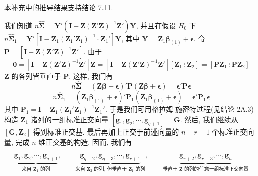 
本补充中的推导结果支持结论 7.11.

我们知道 $n\hat{\boldsymbol{\Sigma}}=\mathbf{Y}'(\mathbf{I}-\mathbf{Z}(\mathbf{Z}'\mathbf{Z})^{-1}\mathbf{Z}')\mathbf{Y}$, 并且在假设 $H_0$ 下 $n\hat{\boldsymbol{\Sigma}}_1=\mathbf{Y}'[\mathbf{I}-\mathbf{Z}_1(\mathbf{Z}_1'\mathbf{Z}_1)^{-1}\cdot\mathbf{Z}_1']\mathbf{Y}$, 其中 $\mathbf{Y}=\mathbf{Z}_1\boldsymbol{\beta}_{(1)}+\boldsymbol{\epsilon}$. 令 $\mathbf{P}=[\mathbf{I}-\mathbf{Z}(\mathbf{Z}'\mathbf{Z})^{-1}\mathbf{Z}']$. 由于
\[
\mathbf{0}=[\mathbf{I}-\mathbf{Z}(\mathbf{Z}'\mathbf{Z})^{-1}\mathbf{Z}']\mathbf{Z}
=[\mathbf{I}-\mathbf{Z}(\mathbf{Z}'\mathbf{Z})^{-1}\mathbf{Z}'][\mathbf{Z}_1\ \vdots\ \mathbf{Z}_2]
=[\mathbf{P}\mathbf{Z}_1\ \vdots\ \mathbf{P}\mathbf{Z}_2]
\]
$\mathbf{Z}$ 的各列皆垂直于 $\mathbf{P}$. 这样, 我们有
\[
n\hat{\boldsymbol{\Sigma}}=(\mathbf{Z}\boldsymbol{\beta}+\boldsymbol{\epsilon})'\mathbf{P}(\mathbf{Z}\boldsymbol{\beta}+\boldsymbol{\epsilon})=\boldsymbol{\epsilon}'\mathbf{P}\boldsymbol{\epsilon}
\]
\[
n\hat{\boldsymbol{\Sigma}}_1=(\mathbf{Z}_1\boldsymbol{\beta}_{(1)}+\boldsymbol{\epsilon})'\mathbf{P}_1(\mathbf{Z}_1\boldsymbol{\beta}_{(1)}+\boldsymbol{\epsilon})=\boldsymbol{\epsilon}'\mathbf{P}_1\boldsymbol{\epsilon}
\]
其中 $\mathbf{P}_1=\mathbf{I}-\mathbf{Z}_1(\mathbf{Z}_1'\mathbf{Z}_1)^{-1}\mathbf{Z}_1'$. 于是我们可用格拉姆-施密特过程(见结论 2A.3)构造 $\mathbf{Z}_1$ 诸列的一组标准正交向量 $[\mathbf{g}_1,\mathbf{g}_2,\cdots,\mathbf{g}_{q+1}]=\mathbf{G}$. 然后, 我们继续从 $[\mathbf{G},\mathbf{Z}_2]$ 得到标准正交基. 最后再加上正交于前述向量的 $n-r-1$ 个标准正交向量, 完成 $n$ 维正交基的构造. 因而, 我们有

\[
\underbrace{\mathbf{g}_1,\mathbf{g}_2,\cdots,\mathbf{g}_{q+1}}_{\text{来自 }\mathbf{Z}_1\text{ 的列}},\qquad
\underbrace{\mathbf{g}_{q+2},\mathbf{g}_{q+3},\cdots,\mathbf{g}_{r+1}}_{\text{来自 }\mathbf{Z}_2\text{ 的列, 但垂直于 }\mathbf{Z}_1\text{ 的列}},\qquad
\underbrace{\mathbf{g}_{r+2},\mathbf{g}_{r+3},\cdots,\mathbf{g}_n}_{\text{垂直于 }\mathbf{Z}\text{ 的列的任意一组标准正交向量}}
\]

